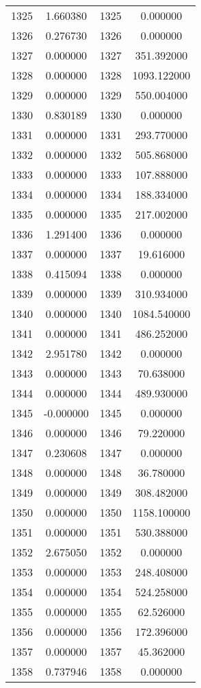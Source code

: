 \documentclass[12pt]{article}
\begin{document}
\begin{longtable}{@{}cccc@{}}
1325 & 1.660380 & 1325 & 0.000000 \\
1326 & 0.276730 & 1326 & 0.000000 \\
1327 & 0.000000 & 1327 & 351.392000 \\
1328 & 0.000000 & 1328 & 1093.122000 \\
1329 & 0.000000 & 1329 & 550.004000 \\
1330 & 0.830189 & 1330 & 0.000000 \\
1331 & 0.000000 & 1331 & 293.770000 \\
1332 & 0.000000 & 1332 & 505.868000 \\
1333 & 0.000000 & 1333 & 107.888000 \\
1334 & 0.000000 & 1334 & 188.334000 \\
1335 & 0.000000 & 1335 & 217.002000 \\
1336 & 1.291400 & 1336 & 0.000000 \\
1337 & 0.000000 & 1337 & 19.616000 \\
1338 & 0.415094 & 1338 & 0.000000 \\
1339 & 0.000000 & 1339 & 310.934000 \\
1340 & 0.000000 & 1340 & 1084.540000 \\
1341 & 0.000000 & 1341 & 486.252000 \\
1342 & 2.951780 & 1342 & 0.000000 \\
1343 & 0.000000 & 1343 & 70.638000 \\
1344 & 0.000000 & 1344 & 489.930000 \\
1345 & -0.000000 & 1345 & 0.000000 \\
1346 & 0.000000 & 1346 & 79.220000 \\
1347 & 0.230608 & 1347 & 0.000000 \\
1348 & 0.000000 & 1348 & 36.780000 \\
1349 & 0.000000 & 1349 & 308.482000 \\
1350 & 0.000000 & 1350 & 1158.100000 \\
1351 & 0.000000 & 1351 & 530.388000 \\
1352 & 2.675050 & 1352 & 0.000000 \\
1353 & 0.000000 & 1353 & 248.408000 \\
1354 & 0.000000 & 1354 & 524.258000 \\
1355 & 0.000000 & 1355 & 62.526000 \\
1356 & 0.000000 & 1356 & 172.396000 \\
1357 & 0.000000 & 1357 & 45.362000 \\
1358 & 0.737946 & 1358 & 0.000000 \\

\end{longtable}
\end{document}
